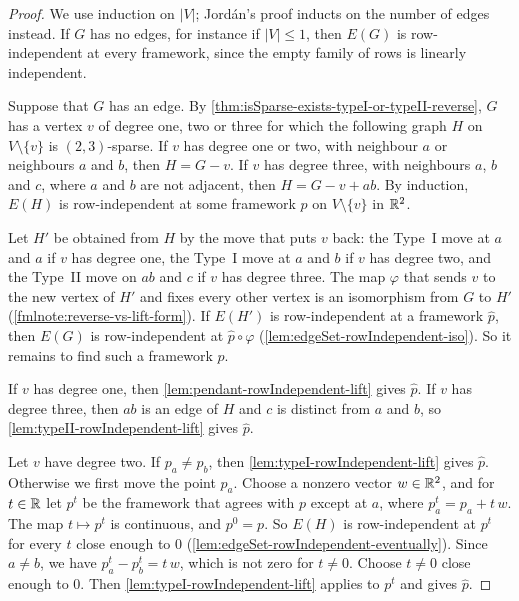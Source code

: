 \begin{proof}
  \leanok
  We use induction on $|V|$; Jord\'an's proof inducts on the number of
  edges instead. If $G$ has no edges, for instance if $|V| \le 1$, then
  $E(G)$ is row-independent at every framework, since the empty family
  of rows is linearly independent.

  Suppose that $G$ has an edge. By
  \cref{thm:isSparse-exists-typeI-or-typeII-reverse}, $G$ has a vertex
  $v$ of degree one, two or three for which the following graph $H$ on
  $V \setminus \{v\}$ is $(2,3)$-sparse. If $v$ has degree one or two,
  with neighbour $a$ or neighbours $a$ and $b$, then $H = G - v$. If
  $v$ has degree three, with neighbours $a$, $b$ and $c$, where $a$ and
  $b$ are not adjacent, then $H = G - v + ab$. By induction, $E(H)$ is
  row-independent at some framework $p$ on $V \setminus \{v\}$ in
  ${\mathbb{R}}^{2}$.

  Let $H'$ be obtained from $H$ by the move that puts $v$ back: the
  Type~I move at $a$ and $a$ if $v$ has degree one, the Type~I move at
  $a$ and $b$ if $v$ has degree two, and the Type~II move on $ab$ and
  $c$ if $v$ has degree three. The map $\varphi$ that sends $v$ to the
  new vertex of $H'$ and fixes every other vertex is an isomorphism
  from $G$ to $H'$ (\cref{fmlnote:reverse-vs-lift-form}). If $E(H')$ is
  row-independent at a framework $\hat p$, then $E(G)$ is
  row-independent at $\hat p \circ \varphi$
  (\cref{lem:edgeSet-rowIndependent-iso}). So it remains to find such a
  framework $\hat p$.

  If $v$ has degree one, then \cref{lem:pendant-rowIndependent-lift}
  gives $\hat p$. If $v$ has degree three, then $ab$ is an edge of $H$
  and $c$ is distinct from $a$ and $b$, so
  \cref{lem:typeII-rowIndependent-lift} gives $\hat p$.

  Let $v$ have degree two. If $p_a \ne p_b$, then
  \cref{lem:typeI-rowIndependent-lift} gives $\hat p$. Otherwise we
  first move the point $p_a$. Choose a nonzero vector $w \in {\mathbb{R}}^{2}$,
  and for $t \in {\mathbb{R}}$ let $p^{t}$ be the framework that agrees with $p$
  except at $a$, where $p^{t}_a = p_a + t\,w$. The map
  $t \mapsto p^{t}$ is continuous, and $p^{0} = p$. So $E(H)$ is
  row-independent at $p^{t}$ for every $t$ close enough to $0$
  (\cref{lem:edgeSet-rowIndependent-eventually}). Since $a \ne b$, we
  have $p^{t}_a - p^{t}_b = t\,w$, which is not zero for $t \ne 0$.
  Choose $t \ne 0$ close enough to $0$. Then
  \cref{lem:typeI-rowIndependent-lift} applies to $p^{t}$ and gives
  $\hat p$.
\end{proof}


